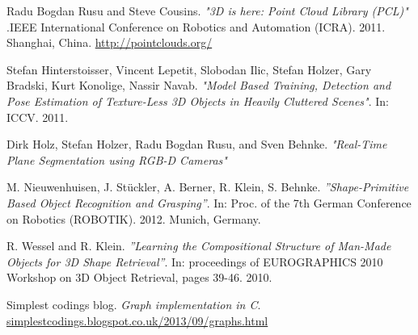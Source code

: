 \documentclass[fontsize=12pt]{article}
\begin{document}
\begin{thebibliography}{9}
   Radu Bogdan Rusu and Steve Cousins. \emph{"3D is here: Point Cloud Library (PCL)"}
  .IEEE International Conference on Robotics and Automation (ICRA). 2011. Shanghai, China.
  \url{http://pointclouds.org/}   
  
   Stefan Hinterstoisser, Vincent Lepetit, Slobodan Ilic, Stefan Holzer, Gary
Bradski, Kurt Konolige, Nassir Navab.
   \emph{"Model Based Training, Detection and Pose
Estimation of Texture-Less 3D Objects in
Heavily Cluttered Scenes"}. In: ICCV. 2011. 
   
   Dirk Holz, Stefan Holzer, Radu Bogdan Rusu, and Sven Behnke. 
    \emph{"Real-Time Plane Segmentation using RGB-D Cameras"} 

    M. Nieuwenhuisen, J. Stückler, A. Berner, R. Klein, S. Behnke.
   \emph{''Shape-Primitive Based Object Recognition and Grasping''}.
   In: Proc. of the 7th German Conference on Robotics (ROBOTIK). 2012. Munich, Germany.

   R. Wessel and R. Klein.
  \emph{''Learning the Compositional Structure of Man-Made Objects for 3D Shape Retrieval''}.
  In: proceedings of EUROGRAPHICS 2010 Workshop on 3D Object Retrieval, pages 39-46. 2010.

  Simplest codings blog.
  \emph{Graph implementation in C}.
  \url{simplestcodings.blogspot.co.uk/2013/09/graphs.html}
\end{thebibliography}
\end{document}
